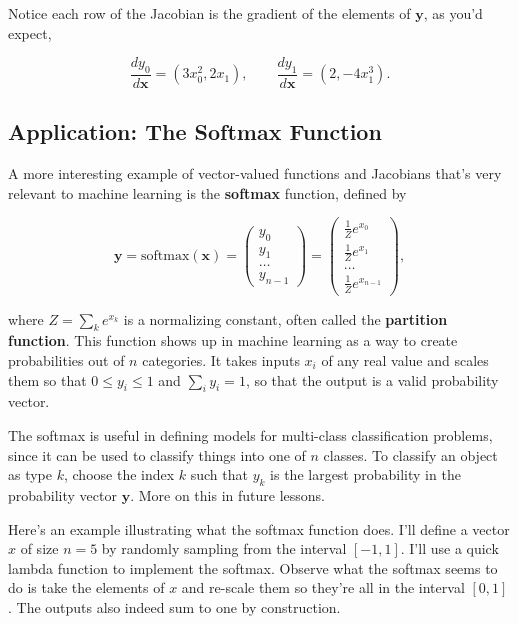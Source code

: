 \documentclass[
  letterpaper,
  DIV=11,
  numbers=noendperiod]{scrreprt}
\begin{document}
Notice each row of the Jacobian is the gradient of the elements of
\(\mathbf{y}\), as you'd expect,

\[\frac{dy_0}{d\mathbf{x}} = (3x_0^2, 2x_1), \qquad \frac{dy_1}{d\mathbf{x}} = (2, -4x_1^3).\]

\hypertarget{application-the-softmax-function}{%
\subsection{Application: The Softmax
Function}\label{application-the-softmax-function}}

A more interesting example of vector-valued functions and Jacobians
that's very relevant to machine learning is the \textbf{softmax}
function, defined by

\[
\mathbf{y} = \text{softmax}(\mathbf{x}) = 
\begin{pmatrix} 
y_0 \\ 
y_1 \\
\dots \\
y_{n-1}
\end{pmatrix} =
\begin{pmatrix} 
\frac{1}{Z} e^{x_0} \\
\frac{1}{Z} e^{x_1} \\
\dots \\
\frac{1}{Z} e^{x_{n-1}}
\end{pmatrix},
\]

where \(Z = \sum_k e^{x_k}\) is a normalizing constant, often called the
\textbf{partition function}. This function shows up in machine learning
as a way to create probabilities out of \(n\) categories. It takes
inputs \(x_i\) of any real value and scales them so that
\(0 \leq y_i \leq 1\) and \(\sum_i y_i = 1\), so that the output is a
valid probability vector.

The softmax is useful in defining models for multi-class classification
problems, since it can be used to classify things into one of \(n\)
classes. To classify an object as type \(k\), choose the index \(k\)
such that \(y_k\) is the largest probability in the probability vector
\(\mathbf{y}\). More on this in future lessons.

Here's an example illustrating what the softmax function does. I'll
define a vector \(x\) of size \(n=5\) by randomly sampling from the
interval \([-1,1]\). I'll use a quick lambda function to implement the
softmax. Observe what the softmax seems to do is take the elements of
\(x\) and re-scale them so they're all in the interval \([0,1]\). The
outputs also indeed sum to one by construction.
\end{document}
